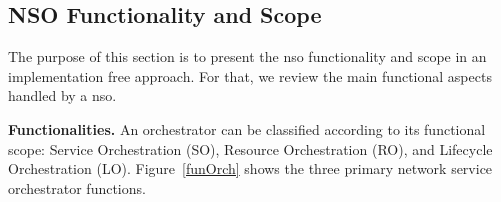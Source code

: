 
\subsection{NSO Functionality and Scope}
\label{sec:def}



The purpose of this section is to present the \gls{nso} functionality and scope in an implementation free approach. For that, we review the main functional aspects handled by a \gls{nso}.

\textbf{Functionalities.} An orchestrator can be classified according to its functional scope: Service Orchestration (SO), Resource Orchestration (RO), and Lifecycle Orchestration (LO). Figure~\ref{funOrch} shows the three primary network service orchestrator functions.


